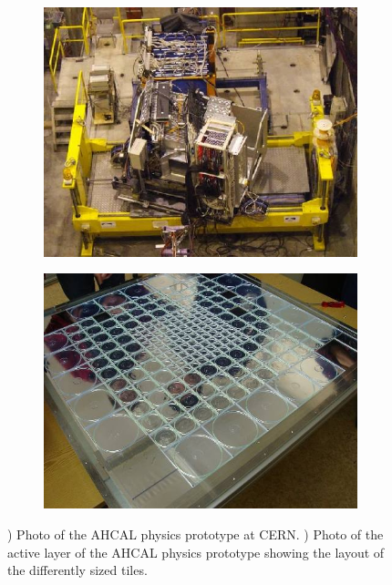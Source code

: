 \begin{figure}[htbp!]
  \centering
  \begin{subfigure}[t]{0.49\textwidth}
    \includegraphics[width=1.\linewidth]{chap3/fig/CERN_setup.png}
    \caption{} \label{fig:AHCALPhysics}
  \end{subfigure}
  \hfill
  \begin{subfigure}[t]{0.49\textwidth}
    \includegraphics[width=1.\linewidth]{chap3/fig/moduleinside.png}
    \caption{} \label{fig:AHCALPhysics2}
  \end{subfigure}
  \caption{) Photo of the AHCAL physics prototype at CERN. ) Photo of the active layer of the AHCAL physics prototype showing the layout of the differently sized tiles.}
\end{figure}

